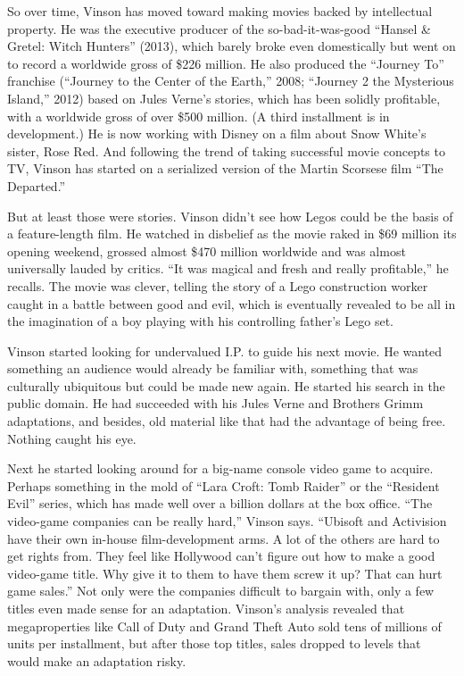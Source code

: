 So over time, Vinson has moved toward making movies backed by
intellectual property. He was the executive producer of the
so-bad-it-was-good ``Hansel \& Gretel: Witch Hunters'' (2013), which
barely broke even domestically but went on to record a worldwide gross
of \$226 million. He also produced the ``Journey To'' franchise
(``Journey to the Center of the Earth,'' 2008; ``Journey 2 the
Mysterious Island,'' 2012) based on Jules Verne's stories, which has
been solidly profitable, with a worldwide gross of over \$500 million.
(A third installment is in development.) He is now working with Disney
on a film about Snow White's sister, Rose Red. And following the trend
of taking successful movie concepts to TV, Vinson has started on a
serialized version of the Martin Scorsese film ``The Departed.''

But at least those were stories. Vinson didn't see how Legos could be
the basis of a feature-­length film. He watched in disbelief as the
movie raked in \$69 million its opening weekend, grossed almost \$470
million worldwide and was almost universally lauded by critics. ``It was
magical and fresh and really profitable,'' he recalls. The movie was
clever, telling the story of a Lego construction worker caught in a
battle between good and evil, which is eventually revealed to be all in
the imagination of a boy playing with his controlling father's Lego set.

Vinson started looking for undervalued I.P. to guide his next movie. He
wanted something an audience would already be familiar with, something
that was culturally ubiquitous but could be made new again. He started
his search in the public domain. He had succeeded with his Jules Verne
and Brothers Grimm adaptations, and besides, old material like that had
the advantage of being free. Nothing caught his eye.

Next he started looking around for a big-name console video game to
acquire. Perhaps something in the mold of ``Lara Croft: Tomb Raider'' or
the ``Resident Evil'' series, which has made well over a billion dollars
at the box office. ``The video-­game companies can be really hard,''
Vinson says. ``Ubisoft and Activision have their own in-house
film-­development arms. A lot of the others are hard to get rights from.
They feel like Hollywood can't figure out how to make a good video-­game
title. Why give it to them to have them screw it up? That can hurt game
sales.'' Not only were the companies difficult to bargain with, only a
few titles even made sense for an adaptation. Vinson's analysis revealed
that megaproperties like Call of Duty and Grand Theft Auto sold tens of
millions of units per installment, but after those top titles, sales
dropped to levels that would make an adaptation risky.

